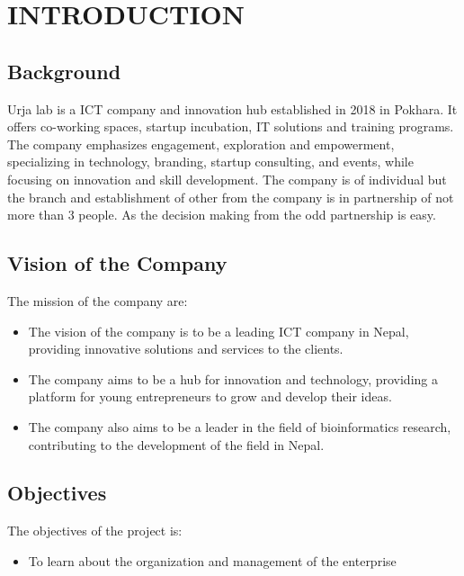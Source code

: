 \setcounter{page}{1}
\chapter{INTRODUCTION}
    \section{Background}
        Urja lab is a ICT company and innovation hub established in 2018 in Pokhara. It offers co-working spaces, startup incubation, IT solutions and training programs. The company emphasizes engagement, exploration and empowerment, specializing in technology, branding, startup consulting, and events, while focusing on innovation and skill development. The company is of individual but the branch and establishment of other from the company is in partnership of not more than 3 people. As the decision making from the odd partnership is easy.

    \section{Vision of the Company} 
    The mission of the company are:
  \begin{itemize}
    \item The vision of the company is to be a leading ICT company in Nepal, providing innovative solutions and services to the clients.
    \item The company aims to be a hub for innovation and technology, providing a platform for young entrepreneurs to grow and develop their ideas.
    \item The company also aims to be a leader in the field of bioinformatics research, contributing to the development of the field in Nepal.

  \end{itemize}  
    
    
    \section{Objectives}
    The objectives of the project is:
        \begin{itemize}
        \setlength\itemsep{1.5pt}
        \item To learn about the organization and management of the enterprise

        \end{itemize}


    
    
